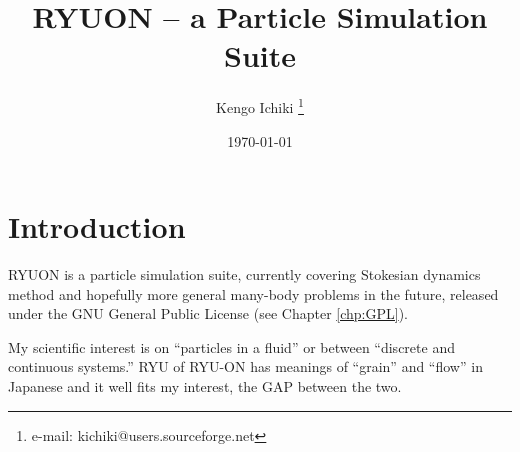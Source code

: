 \documentclass{book}
\begin{document}
\title{RYUON -- a Particle Simulation Suite}
\author{Kengo Ichiki
 \thanks{e-mail: kichiki@users.sourceforge.net}}
\date{\today}

\maketitle

\tableofcontents

\chapter{Introduction}
RYUON is a particle simulation suite,
currently covering Stokesian dynamics method
and hopefully more general many-body problems in the future,
released under the GNU General Public License (see Chapter \ref{chp:GPL}).


My scientific interest is on ``particles in a fluid'' 
or between ``discrete and continuous systems.''
RYU of RYU-ON has meanings of ``grain'' and ``flow'' 
in Japanese and it well fits my interest, the GAP between the two.
\end{document}
